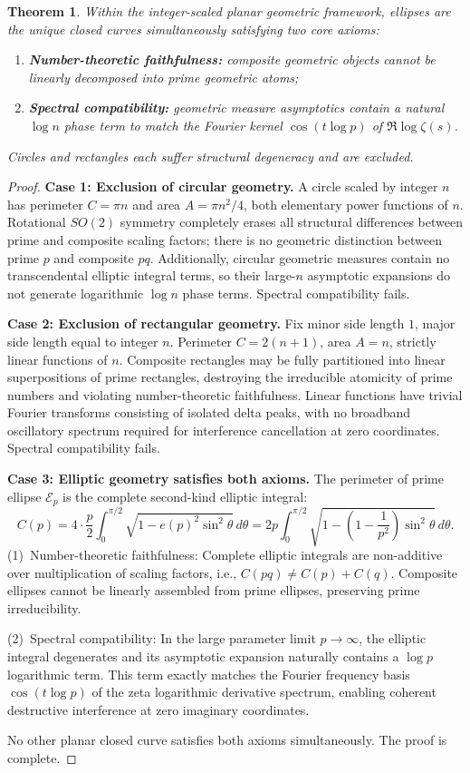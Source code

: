 \documentclass[10pt,reqno]{article}
\newcommand{\eprimep}{e(p)}
\newtheorem{thm}{Theorem}[section]
\begin{document}
\begin{thm}\label{thm:exclusivity}
Within the integer-scaled planar geometric framework, ellipses are the unique closed curves simultaneously satisfying two core axioms:
\begin{enumerate}
\item \textbf{Number-theoretic faithfulness:} composite geometric objects cannot be linearly decomposed into prime geometric atoms;
\item \textbf{Spectral compatibility:} geometric measure asymptotics contain a natural $\log n$ phase term to match the Fourier kernel $\cos(t\log p)$ of $\Re\log\zeta(s)$.
\end{enumerate}
Circles and rectangles each suffer structural degeneracy and are excluded.
\end{thm}
\begin{proof}
\textbf{Case 1: Exclusion of circular geometry.}
A circle scaled by integer $n$ has perimeter $C=\pi n$ and area $A=\pi n^2/4$, both elementary power functions of $n$. Rotational $SO(2)$ symmetry completely erases all structural differences between prime and composite scaling factors; there is no geometric distinction between prime $p$ and composite $pq$. Additionally, circular geometric measures contain no transcendental elliptic integral terms, so their large-$n$ asymptotic expansions do not generate logarithmic $\log n$ phase terms. Spectral compatibility fails.

\textbf{Case 2: Exclusion of rectangular geometry.}
Fix minor side length $1$, major side length equal to integer $n$. Perimeter $C=2(n+1)$, area $A=n$, strictly linear functions of $n$. Composite rectangles may be fully partitioned into linear superpositions of prime rectangles, destroying the irreducible atomicity of prime numbers and violating number-theoretic faithfulness. Linear functions have trivial Fourier transforms consisting of isolated delta peaks, with no broadband oscillatory spectrum required for interference cancellation at zero coordinates. Spectral compatibility fails.

\textbf{Case 3: Elliptic geometry satisfies both axioms.}
The perimeter of prime ellipse $\mathcal{E}_p$ is the complete second-kind elliptic integral:
\[
C(p) = 4\cdot \frac{p}{2}\int_0^{\pi/2}\sqrt{1-\eprimep^2\sin^2\theta}\,d\theta = 2p\int_0^{\pi/2}\sqrt{1-\left(1-\frac{1}{p^2}\right)\sin^2\theta}\,d\theta.
\]
(1)~Number-theoretic faithfulness: Complete elliptic integrals are non-additive over multiplication of scaling factors, i.e., $C(pq)\neq C(p)+C(q)$. Composite ellipses cannot be linearly assembled from prime ellipses, preserving prime irreducibility.

(2)~Spectral compatibility: In the large parameter limit $p\to\infty$, the elliptic integral degenerates and its asymptotic expansion naturally contains a $\log p$ logarithmic term. This term exactly matches the Fourier frequency basis $\cos(t\log p)$ of the zeta logarithmic derivative spectrum, enabling coherent destructive interference at zero imaginary coordinates.

No other planar closed curve satisfies both axioms simultaneously. The proof is complete.
\end{proof}
\end{document}
